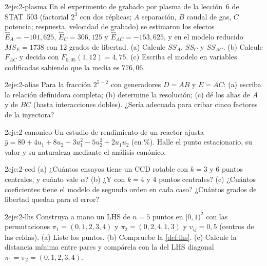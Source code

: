 \begin{ejercicio}{2}{eje:2-plasma}
En el experimento de grabado por plasma de la lección~6 de STAT~503 (factorial $2^3$ con dos réplicas; $A$ separación, $B$ caudal de gas, $C$ potencia; respuesta, velocidad de grabado) se estimaron los efectos $\hat E_A=-101{,}625$, $\hat E_C=306{,}125$ y $\hat E_{AC}=-153{,}625$, y en el modelo reducido $MS_E=1738$ con 12 grados de libertad. (a) Calcule $SS_A$, $SS_C$ y $SS_{AC}$. (b) Calcule $F_{AC}$ y decida con $F_{0{,}05}(1,12)=4{,}75$. (c) Escriba el modelo en variables codificadas sabiendo que la media es $776{,}06$.
\end{ejercicio}

\begin{ejercicio}{2}{eje:2-alias}
Para la fracción $2^{5-2}$ con generadores $D=AB$ y $E=AC$: (a) escriba la relación definidora completa; (b) determine la resolución; (c) dé los alias de $A$ y de $BC$ (hasta interacciones dobles). ¿Sería adecuada para cribar cinco factores de la inyectora?
\end{ejercicio}

\begin{ejercicio}{2}{eje:2-canonico}
Un estudio de rendimiento de un reactor ajusta $\hat y=80+4u_1+8u_2-3u_1^2-5u_2^2+2u_1u_2$ (en \%). Halle el punto estacionario, su valor y su naturaleza mediante el análisis canónico.
\end{ejercicio}

\begin{ejercicio}{2}{eje:2-ccd}
(a) ¿Cuántos ensayos tiene un CCD rotable con $k=3$ y 6 puntos centrales, y cuánto vale $\alpha$? (b) ¿Y con $k=4$ y 4 puntos centrales? (c) ¿Cuántos coeficientes tiene el modelo de segundo orden en cada caso? ¿Cuántos grados de libertad quedan para el error?
\end{ejercicio}

\begin{ejercicio}{2}{eje:2-lhs}
Construya a mano un LHS de $n=5$ puntos en $[0,1)^2$ con las permutaciones $\pi_1=(0,1,2,3,4)$ y $\pi_2=(0,2,4,1,3)$ y $v_{ij}=0{,}5$ (centros de las celdas). (a) Liste los puntos. (b) Compruebe la \cref{def:lhs}. (c) Calcule la distancia mínima entre pares y compárela con la del LHS diagonal $\pi_1=\pi_2=(0,1,2,3,4)$.
\end{ejercicio}


